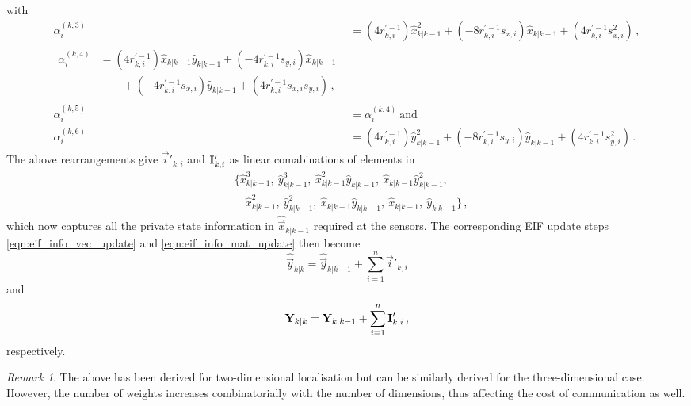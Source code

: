 \documentclass[10pt,letterpaper,oneside,twocolumn,journal]{IEEEtran}
\theoremstyle{definition}
\theoremstyle{definition}
\theoremstyle{remark}
\newtheorem*{remark}{Remark}
\begin{document}
with
\begin{align*}
    \alpha_i^{(k,3)} &= (4r_{k,i}^{\prime-1})\hat{x}_{k|k-1}^2 + (-8r_{k,i}^{\prime-1}s_{x,i})\hat{x}_{k|k-1} + (4r_{k,i}^{\prime-1}s_{x,i}^2)\,, \\
    \begin{split}
        \alpha_i^{(k,4)} &= (4r_{k,i}^{\prime-1})\hat{x}_{k|k-1}\hat{y}_{k|k-1} + (-4r_{k,i}^{\prime-1}s_{y,i})\hat{x}_{k|k-1}  \\
        &\qquad+ (-4r_{k,i}^{\prime-1}s_{x,i})\hat{y}_{k|k-1} + (4r_{k,i}^{\prime-1}s_{x,i}s_{y,i})\,,
    \end{split}\\
    \alpha_i^{(k,5)} &= \alpha_i^{(k,4)}\ \textrm{and} \\
    \alpha_i^{(k,6)} &= (4r_{k,i}^{\prime-1})\hat{y}_{k|k-1}^2 + (-8r_{k,i}^{\prime-1}s_{y,i})\hat{y}_{k|k-1} + (4r_{k,i}^{\prime-1}s_{y,i}^2)\,.
\end{align*}
The above rearrangements give $\vec{i}'_{k,i}$ and ${{\mathbf{I}}}'_{k,i}$ as linear comabinations of elements in
\begin{equation}
    \begin{split}
        &\{ \hat{x}_{k|k-1}^3,\ \hat{y}_{k|k-1}^3,\ \hat{x}_{k|k-1}^2\hat{y}_{k|k-1},\ \hat{x}_{k|k-1}\hat{y}_{k|k-1}^2,\\
        &\quad \hat{x}_{k|k-1}^2,\ \hat{y}_{k|k-1}^2,\ \hat{x}_{k|k-1}\hat{y}_{k|k-1},\ \hat{x}_{k|k-1},\ \hat{y}_{k|k-1}\}\,,
    \end{split} \label{eqn:weights_to_broadcast}
\end{equation}
which now captures all the private state information in $\hat{\vec{x}}_{k|k-1}$ required at the sensors. The corresponding EIF update steps \eqref{eqn:eif_info_vec_update} and \eqref{eqn:eif_info_mat_update} then become
\begin{equation}
    \hat{\vec{y}}_{k|k} = \hat{\vec{y}}_{k|k-1} + \sum^n_{i=1}\vec{i}'_{k,i} \label{eqn:eif_modified_vec_update}
\end{equation}
and
\begin{equation}
    \mat{Y}_{k|k} = \mat{Y}_{k|k-1} + \sum^n_{i=1}\mat{I}'_{k,i}\,, \label{eqn:eif_modified_mat_update}
\end{equation}
respectively.
\begin{remark}
    The above has been derived for two-dimensional localisation but can be similarly derived for the three-dimensional case. However, the number of weights increases combinatorially with the number of dimensions, thus affecting the cost of communication as well.
\end{remark}
\end{document}
